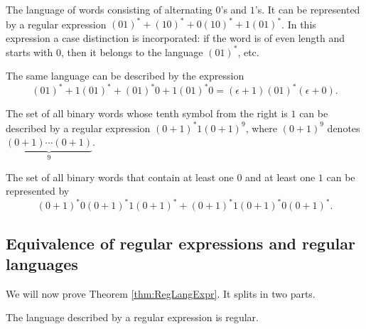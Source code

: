 \begin{page}

\begin{exl}
The language of words consisting of alternating $0$'s and $1$'s.
It can be represented by a regular expression $(01)^* + (10)^* + 0(10)^* + 1(01)^*$.
In this expression a case distinction is incorporated: if the word is of even length and starts with $0$,
then it belongs to the language $(01)^*$, etc.

The same language can be described by the expression
\[
(01)^* + 1(01)^* + (01)^*0 + 1(01)^*0 = (\epsilon + 1)(01)^*(\epsilon + 0).
\]
\end{exl}

\end{page}

\begin{page}

\begin{exl}
The set of all binary words whose tenth symbol from the right is $1$ can be described by a regular expression $(0+1)^* 1 (0+1)^9$,
where $(0+1)^9$ denotes $\underbrace{(0+1)\cdots (0+1)}_{9}$.
\end{exl}

\end{page}

\begin{page}

\begin{exl}
The set of all binary words that contain at least one $0$ and at least one $1$
can be represented by
\[
(0+1)^*0(0+1)^*1(0+1)^* + (0+1)^*1(0+1)^*0(0+1)^*.
\]
\end{exl}

\end{page}

\begin{page}

\subsection{Equivalence of regular expressions and regular languages}
We will now prove Theorem \ref{thm:RegLangExpr}.
It splits in two parts.


\end{page}

\begin{page}

\begin{lem}
The language described by a regular expression is regular.
\end{lem}

\end{page}

